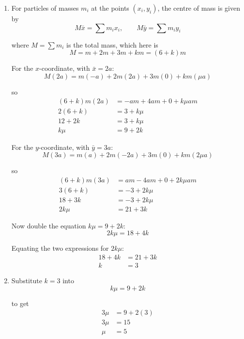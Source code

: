 \documentclass[leqno]{article}
\begin{document}
\begin{enumerate}[
  label=\textbf{\arabic*.},
  leftmargin=*,
  topsep=0pt,
  partopsep=0pt,
  parsep=0pt
]
\vspace*{10pt}

\begin{djsSolution}
\begin{enumerate}[label=\textbf{(\alph*)}, start=1]
  \item For particles of masses $m_i$ at the points $(x_i,y_i)$, the centre of mass is given by
  \[
  M\bar{x}=\sum m_ix_i,\qquad M\bar{y}=\sum m_iy_i
  \]

  where $M=\sum m_i$ is the total mass, which here is
  \[
  M=m+2m+3m+km=(6+k)m
  \]

  For the $x$-coordinate, with $\bar{x}=2a$:
  \[
  M(2a)=m(-a)+2m(2a)+3m(0)+km(\mu a)
  \]

  so
  \begin{align*}
  (6+k)m(2a)&=-am+4am+0+k\mu am \\
  2(6+k)&=3+k\mu \\
  12+2k&=3+k\mu \\
  k\mu&=9+2k
  \end{align*}

  For the $y$-coordinate, with $\bar{y}=3a$:
  \[
  M(3a)=m(a)+2m(-2a)+3m(0)+km(2\mu a)
  \]

  so
  \begin{align*}
  (6+k)m(3a)&=am-4am+0+2k\mu am \\
  3(6+k)&=-3+2k\mu \\
  18+3k&=-3+2k\mu \\
  2k\mu&=21+3k
  \end{align*}

  Now double the equation $k\mu=9+2k$:
  \[
  2k\mu=18+4k
  \]

  Equating the two expressions for $2k\mu$:
  \begin{align*}
  18+4k&=21+3k \\
  k&=3
  \end{align*}

  \item Substitute $k=3$ into
  \[
  k\mu=9+2k
  \]

  to get
  \begin{align*}
  3\mu&=9+2(3) \\
  3\mu&=15 \\
  \mu&=5
  \end{align*}
\end{enumerate}
\end{djsSolution}


\newpage

\questionitem


\end{enumerate}
\end{document}
